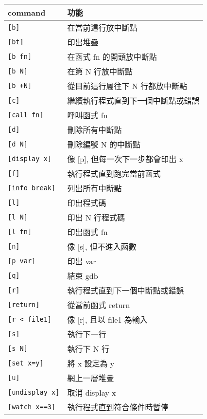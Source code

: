 \begin{tabular}[c]{|l|l|}
    \hline
    command             & 功能 \\
    \hline
    \verb|[b]|          & 在當前這行放中斷點 \\
    \verb|[bt]|         & 印出堆疊 \\
    \verb|[b fn]|       & 在函式 fn 的開頭放中斷點 \\
    \verb|[b N]|        & 在第 N 行放中斷點 \\
    \verb|[b +N]|       & 從目前這行屬往下 N 行都放中斷點 \\
    \verb|[c]|          & 繼續執行程式直到下一個中斷點或錯誤 \\
    \verb|[call fn]|    & 呼叫函式 fn \\
    \verb|[d]|          & 刪除所有中斷點 \\
    \verb|[d N]|        & 刪除編號 N 的中斷點 \\
    \verb|[display x]|  & 像 [p], 但每一次下一步都會印出 x \\
    \verb|[f]|          & 執行程式直到跑完當前函式 \\
    \verb|[info break]| & 列出所有中斷點 \\
    \verb|[l]|          & 印出程式碼  \\
    \verb|[l N]|        & 印出 N 行程式碼  \\
    \verb|[l fn]|       & 印出函式 fn  \\
    \verb|[n]|          & 像 [s], 但不進入函數 \\
    \verb|[p var]|      & 印出 var \\
    \verb|[q]|          & 結束 gdb \\
    \verb|[r]|          & 執行程式直到下一個中斷點或錯誤 \\
    \verb|[return]|     & 從當前函式 return \\
    \verb|[r < file1]|  & 像 [r], 且以 file1 為輸入 \\
    \verb|[s]|          & 執行下一行 \\
    \verb|[s N]|        & 執行下 N 行 \\
    \verb|[set x=y]|    & 將 x 設定為 y \\
    \verb|[u]|          & 網上一層堆疊 \\
    \verb|[undisplay x]| & 取消 display x \\
    \verb|[watch x==3]| & 執行程式直到符合條件時暫停 \\
    \hline
\end{tabular}